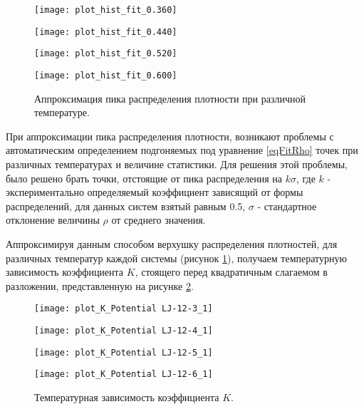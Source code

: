 \begin{figure}[htbp!]
\begin{center}
\begin{minipage}[h]{0.45\linewidth}
\texttt{[image: plot\_hist\_fit\_0.360]}
\end{minipage}
\begin{minipage}[h]{0.45\linewidth}
\texttt{[image: plot\_hist\_fit\_0.440]}
\end{minipage}

\begin{minipage}[h]{0.45\linewidth}
\texttt{[image: plot\_hist\_fit\_0.520]}
\end{minipage}
\begin{minipage}[h]{0.45\linewidth}
\texttt{[image: plot\_hist\_fit\_0.600]}
\end{minipage}
\caption{Аппроксимация пика распределения плотности при различной температуре.}
\label{risHistFit}
\end{center}
\end{figure}

При аппроксимации пика распределения плотности, возникают проблемы с автоматическим определением подгоняемых под уравнение \ref{eqFitRho} точек при различных температурах и величине статистики. Для решения этой проблемы, было решено брать точки, отстоящие от пика распределения на $k\sigma$, где $k$ - экспериментально определяемый коэффициент зависящий от формы распределений, для данных систем взятый равным 0.5, $\sigma$ - стандартное отклонение величины $\rho$ от среднего значения.  

Аппроксимируя данным способом верхушку распределения плотностей, для различных температур каждой системы (рисунок \ref{risHistFit}), получаем температурную зависимость коэффициента $K$, стоящего перед квадратичным слагаемом в разложении, представленную на рисунке \ref{risK}.

\begin{figure}[htbp!]
\begin{center}
\begin{minipage}[h]{0.45\linewidth}
\texttt{[image: plot\_K\_Potential LJ-12-3\_1]}
\end{minipage}
\begin{minipage}[h]{0.45\linewidth}
\texttt{[image: plot\_K\_Potential LJ-12-4\_1]}
\end{minipage}

\begin{minipage}[h]{0.45\linewidth}
\texttt{[image: plot\_K\_Potential LJ-12-5\_1]}
\end{minipage}
\begin{minipage}[h]{0.45\linewidth}
\texttt{[image: plot\_K\_Potential LJ-12-6\_1]}
\end{minipage}
\caption{Температурная зависимость коэффициента $K$.}
\label{risK}
\end{center}
\end{figure}

